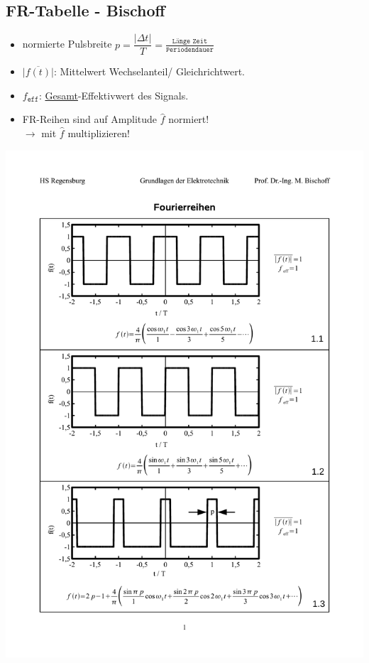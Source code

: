 \subsection{FR-Tabelle - Bischoff}
\begin{itemize}[leftmargin=*]
	\item normierte Pulsbreite $p=\dfrac{|\Delta t|}{T} = \frac{\texttt{Länge Zeit}}{\texttt{Periodendauer}}$
	\item $\overline{|f(t)|}$: Mittelwert Wechselanteil/ Gleichrichtwert.
	\item $f_{\texttt{eff}}$: \underline{Gesamt}-Effektivwert des Signals.
	\item FR-Reihen sind auf Amplitude $\hat{f}$ normiert!\\ $\rightarrow$ mit $\hat{f}$ multiplizieren!
\end{itemize}
\includegraphics[page=1,width=\columnwidth]{./Bilder/Fourierreihen_Bischoff_V2}
